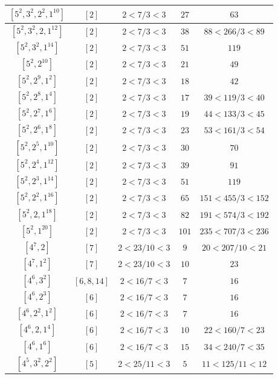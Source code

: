 \documentclass{article}%
\begin{document}
\begin{center}
\begin{longtable}{||c|c|c|c|c||}
$[5^{2}, 3^{2}, 2^{2}, 1^{10}]$ & $[2]$ & $2 < 7/3 < 3$ & $27$ & $63$ \\ \hline 
$[5^{2}, 3^{2}, 2, 1^{12}]$ & $[2]$ & $2 < 7/3 < 3$ & $38$ & $88 < 266/3 < 89$ \\ \hline 
$[5^{2}, 3^{2}, 1^{14}]$ & $[2]$ & $2 < 7/3 < 3$ & $51$ & $119$ \\ \hline 
$[5^{2}, 2^{10}]$ & $[2]$ & $2 < 7/3 < 3$ & $21$ & $49$ \\ \hline 
$[5^{2}, 2^{9}, 1^{2}]$ & $[2]$ & $2 < 7/3 < 3$ & $18$ & $42$ \\ \hline 
$[5^{2}, 2^{8}, 1^{4}]$ & $[2]$ & $2 < 7/3 < 3$ & $17$ & $39 < 119/3 < 40$ \\ \hline 
$[5^{2}, 2^{7}, 1^{6}]$ & $[2]$ & $2 < 7/3 < 3$ & $19$ & $44 < 133/3 < 45$ \\ \hline 
$[5^{2}, 2^{6}, 1^{8}]$ & $[2]$ & $2 < 7/3 < 3$ & $23$ & $53 < 161/3 < 54$ \\ \hline 
$[5^{2}, 2^{5}, 1^{10}]$ & $[2]$ & $2 < 7/3 < 3$ & $30$ & $70$ \\ \hline 
$[5^{2}, 2^{4}, 1^{12}]$ & $[2]$ & $2 < 7/3 < 3$ & $39$ & $91$ \\ \hline 
$[5^{2}, 2^{3}, 1^{14}]$ & $[2]$ & $2 < 7/3 < 3$ & $51$ & $119$ \\ \hline 
$[5^{2}, 2^{2}, 1^{16}]$ & $[2]$ & $2 < 7/3 < 3$ & $65$ & $151 < 455/3 < 152$ \\ \hline 
$[5^{2}, 2, 1^{18}]$ & $[2]$ & $2 < 7/3 < 3$ & $82$ & $191 < 574/3 < 192$ \\ \hline 
$[5^{2}, 1^{20}]$ & $[2]$ & $2 < 7/3 < 3$ & $101$ & $235 < 707/3 < 236$ \\ \hline 
$[4^{7}, 2]$ & $[7]$ & $2 < 23/10 < 3$ & $9$ & $20 < 207/10 < 21$ \\ \hline 
$[4^{7}, 1^{2}]$ & $[7]$ & $2 < 23/10 < 3$ & $10$ & $23$ \\ \hline 
$[4^{6}, 3^{2}]$ & $[6, 8, 14]$ & $2 < 16/7 < 3$ & $7$ & $16$ \\ \hline 
$[4^{6}, 2^{3}]$ & $[6]$ & $2 < 16/7 < 3$ & $7$ & $16$ \\ \hline 
$[4^{6}, 2^{2}, 1^{2}]$ & $[6]$ & $2 < 16/7 < 3$ & $7$ & $16$ \\ \hline 
$[4^{6}, 2, 1^{4}]$ & $[6]$ & $2 < 16/7 < 3$ & $10$ & $22 < 160/7 < 23$ \\ \hline 
$[4^{6}, 1^{6}]$ & $[6]$ & $2 < 16/7 < 3$ & $15$ & $34 < 240/7 < 35$ \\ \hline 
$[4^{5}, 3^{2}, 2^{2}]$ & $[5]$ & $2 < 25/11 < 3$ & $5$ & $11 < 125/11 < 12$ \\ \hline 

\end{longtable}
\end{center}
\end{document}
